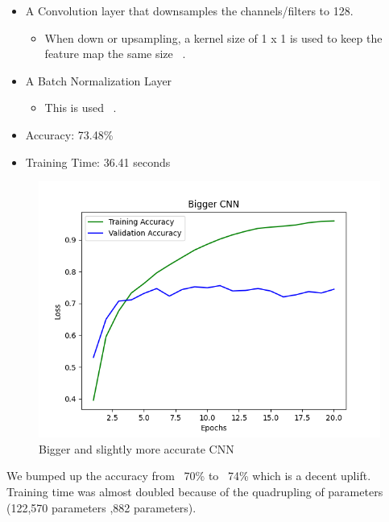 \documentclass{article}
\begin{document}
    \begin{itemize}
      \item A Convolution layer that downsamples the channels/filters to 128.
      \begin{itemize}
          \item When down or upsampling, a kernel size of 1 x 1 is used to keep the feature map the same size ~\cite{mukherjee2022annotated}.
      \end{itemize}
      \item A Batch Normalization Layer
      \begin{itemize}
          \item This is used ~\cite{mukherjee2022annotated}.
      \end{itemize}
    \end{itemize}

    \begin{itemize}
        \item Accuracy: 73.48\%
        \item Training Time: 36.41 seconds
    \end{itemize}

    \begin{figure}[!htbp]
        \centerline{\includegraphics[width=0.55\columnwidth]{Bigger CNN}}
        \caption{Bigger and slightly more accurate CNN}
        \label{fig:bigger}
    \end{figure}

    We bumped up the accuracy from ~70\% to ~74\% which is a decent uplift.
    Training time was almost doubled because of the quadrupling of parameters (122,570 parameters ,882 parameters).



    
    
\end{document}
